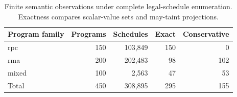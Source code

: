 \begin{table}[t]
\centering
\small
\caption{Finite semantic observations under complete legal-schedule enumeration. Exactness compares scalar-value sets and may-taint projections.}
\label{tab:semantic-results}
\begin{tabular}{lrrrr}
\toprule
\textbf{Program family} & \textbf{Programs} & \textbf{Schedules} & \textbf{Exact} & \textbf{Conservative} \\
\midrule
rpc & 150 & 103,849 & 150 & 0 \\
rma & 200 & 202,483 & 98 & 102 \\
mixed & 100 & 2,563 & 47 & 53 \\
Total & 450 & 308,895 & 295 & 155 \\
\bottomrule
\end{tabular}
\end{table}
